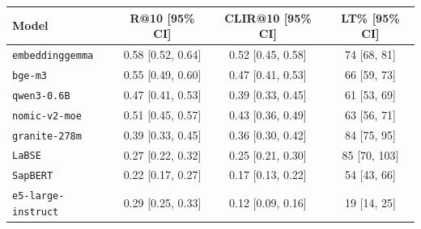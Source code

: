 \begin{tabular}{lccc}
\toprule
Model & R@10 [95\% CI] & CLIR@10 [95\% CI] & LT\% [95\% CI] \\
\midrule
\texttt{embeddinggemma} & 0.58 [0.52, 0.64] & 0.52 [0.45, 0.58] & 74 [68, 81] \\
\texttt{bge-m3} & 0.55 [0.49, 0.60] & 0.47 [0.41, 0.53] & 66 [59, 73] \\
\texttt{qwen3-0.6B} & 0.47 [0.41, 0.53] & 0.39 [0.33, 0.45] & 61 [53, 69] \\
\texttt{nomic-v2-moe} & 0.51 [0.45, 0.57] & 0.43 [0.36, 0.49] & 63 [56, 71] \\
\texttt{granite-278m} & 0.39 [0.33, 0.45] & 0.36 [0.30, 0.42] & 84 [75, 95] \\
\texttt{LaBSE} & 0.27 [0.22, 0.32] & 0.25 [0.21, 0.30] & 85 [70, 103] \\
\texttt{SapBERT} & 0.22 [0.17, 0.27] & 0.17 [0.13, 0.22] & 54 [43, 66] \\
\texttt{e5-large-instruct} & 0.29 [0.25, 0.33] & 0.12 [0.09, 0.16] & 19 [14, 25] \\
\bottomrule
\end{tabular}

